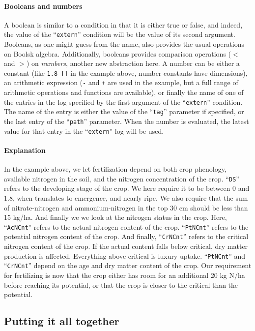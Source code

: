 \documentclass[a4paper]{article}
\newcommand{\dname}[1]{``\texttt{#1}''}
\begin{document}
\paragraph{Booleans and numbers} A boolean is similar to a condition
in that it is either true or false, and indeed, the value of the
\dname{extern} condition will be the value of its second argument.
Booleans, as one might guess from the name, also provides the usual
operations on Boolsk algebra.  Additionally, booleans provides
comparison operations ($<$ and $>$) on \emph{numbers}, another new
abstraction here.  A number can be either a constant (like \texttt{1.8
  []} in the example above, number constants have dimensions), an
arithmetic expression (\texttt{-} and \texttt{+} are used in the
example, but a full range of arithmetic operations and functions are
available), or finally the name of one of the entries in the log
specified by the first argument of the \dname{extern} condition.  The
name of the entry is either the value of the \dname{tag} parameter if
specified, or the last entry of the \dname{path} parameter.  When the
number is evaluated, the latest value for that entry in the
\dname{extern} log will be used.

\paragraph{Explanation} In the example above, we let fertilization
depend on both crop phenology, available nitrogen in the soil, and the
nitrogen concentration of the crop.  \dname{DS} refers to the
developing stage of the crop.  We here require it to be between 0 and
1.8, when translates to emergence, and nearly ripe. We also require
that the sum of nitrate-nitrogen and ammonium-nitrogen in the top 30
cm should be less than 15 kg/ha.  And finally we we look at the
nitrogen status in the crop.  Here, \dname{AcNCnt} refers to the
actual nitrogen content of the crop.  \dname{PtNCnt} refers to the
potential nitrogen content of the crop.  And finally, \dname{CrNCnt}
refers to the critical nitrogen content of the crop.  If the actual
content falls below critical, dry matter production is affected.
Everything above critical is luxury uptake.  \dname{PtNCnt} and
\dname{CrNCnt} depend on the age and dry matter content of the crop.
Our requirement for fertilizing is now that the crop either has room
for an additional 20 kg N/ha before reaching its potential, or that
the crop is closer to the critical than the potential.

\subsection{Putting it all together}
\end{document}

